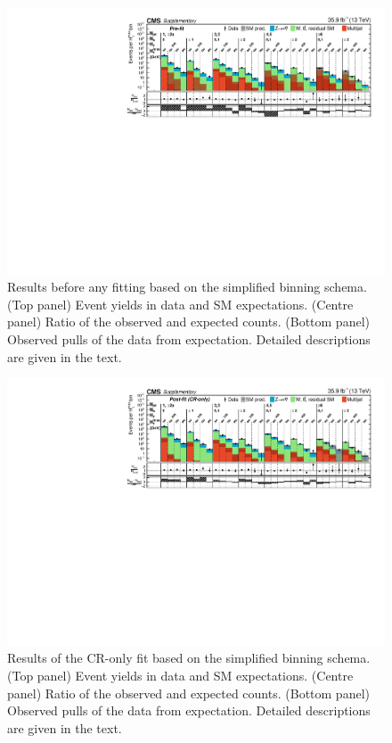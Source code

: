 \begin{figure}[h!]
  \centering
  \includegraphics[width=0.95\linewidth]{Supplementary/SimplifiedBinning_results_no-fit_aux} 
  \caption{Results before any fitting based on the simplified binning
    schema. (Top panel) Event yields in data and SM
    expectations. (Centre panel) Ratio of the observed and expected
    counts. (Bottom panel) Observed pulls of the data from
    expectation. Detailed descriptions are given in the text.
  }
  \label{fig:aggregated_results}
\end{figure}

\begin{figure}[h!]
  \centering
  \includegraphics[width=0.95\linewidth]{Supplementary/SimplifiedBinning_results_cr-only-fit_aux} 
  \caption{Results of the CR-only fit based on the simplified binning
    schema. (Top panel) Event yields in data and SM
    expectations. (Centre panel) Ratio of the observed and expected
    counts. (Bottom panel) Observed pulls of the data from
    expectation. Detailed descriptions are given in the text.
  }
  \label{fig:aggregated_results}
\end{figure}

